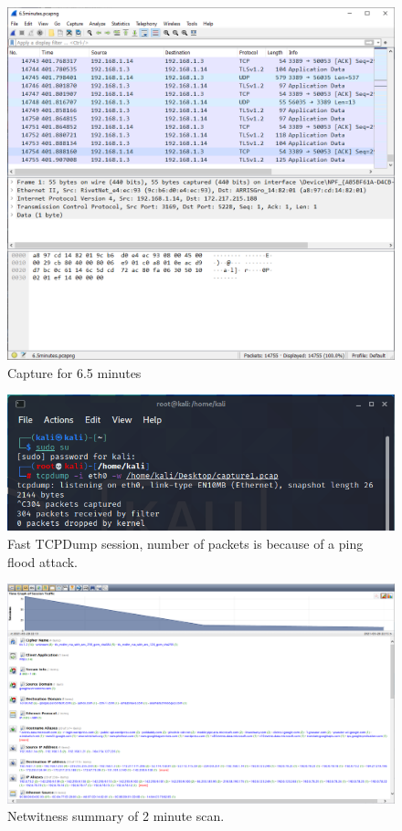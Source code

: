 \begin{figure}[H]
    \centering
    \includegraphics[width=\linewidth]{figures/6.5minutes_wireshark.png}
    \caption{Capture for 6.5 minutes}
    \label{fig:6.5}
\end{figure}

\begin{figure}[H]
    \centering
    \includegraphics[]{figures/tcpdump.png}
    \caption{Fast TCPDump session, number of packets is because of a ping flood attack.}
    \label{fig:tcpdump}
\end{figure}

\begin{figure}[H]
    \centering
    \includegraphics[width=\linewidth]{figures/2minutes_netwitness.png}
    \caption{Netwitness summary of 2 minute scan.}
    \label{fig:netwit2}
\end{figure}

